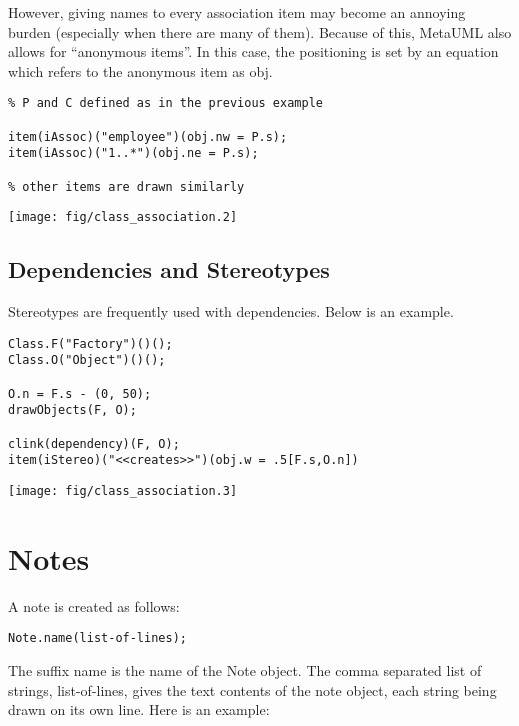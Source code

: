 \documentclass{article}
\newcommand{\code}{\ttfamily}
\begin{document}
However, giving names to every association item may become an annoying burden
(especially when there are many of them). Because of this, MetaUML also allows for
``anonymous items''. In this case, the positioning is set by an equation
which refers to the anonymous item as {\code obj}.

\begin{multicols}{2}
\begin{verbatim}
% P and C defined as in the previous example

item(iAssoc)("employee")(obj.nw = P.s);
item(iAssoc)("1..*")(obj.ne = P.s);

% other items are drawn similarly
\end{verbatim}
\columnbreak
\hspace{3cm}\texttt{[image: fig/class\_association.2]}
\end{multicols}

\subsection{Dependencies and Stereotypes}

Stereotypes are frequently used with dependencies. Below is an example.
\pagebreak

\begin{multicols}{2}
\begin{verbatim}
Class.F("Factory")()();
Class.O("Object")()();

O.n = F.s - (0, 50);
drawObjects(F, O);

clink(dependency)(F, O);
item(iStereo)("<<creates>>")(obj.w = .5[F.s,O.n])
\end{verbatim}
\columnbreak
\hspace{3cm}\texttt{[image: fig/class\_association.3]}
\end{multicols}

\section{Notes}

A note is created as follows:

\begin{verbatim}
Note.name(list-of-lines);
\end{verbatim}

The suffix {\code name} is the name of the {\code Note} object. The comma separated list of strings, {\code list-of-lines}, gives the text contents of the note object, each string being drawn on its own line.
Here is an example:
\end{document}
